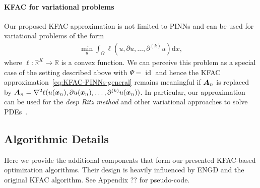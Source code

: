 \paragraph{KFAC for variational problems}
Our proposed KFAC approximation is not limited to PINNs and can be used for variational problems of the form  
\begin{align}
    \min_u \int_\Omega \ell(u, \partial u, \dots, \partial^{(k)} u) \mathrm{d}x,
\end{align}
where $\ell\colon\mathbb R^K\to\mathbb R$ is a convex function. 
We can perceive this problem as a special case of the setting described above with $\Psi = \operatorname{id}$ and hence the KFAC approximation~\eqref{eq:KFAC-PINNs-general} remains meaningful %
if ${\bm{A}}_n$ is replaced by ${\bm{A}}_n = \nabla^2\ell(u({\bm{x}}_n), \partial u({\bm{x}}_n), \dots, \partial^{(k)}u({\bm{x}}_n))$. 
In particular, our approximation can be used for the \emph{deep Ritz method} and other variational approaches to solve PDEs~\citep{yu2018deep}. 

\begin{comment}
    \subsection{Computational complexity}
\todo[inline]{what can we say? probably better to move to the respective approximations}
\begin{itemize}
    \item GN: $O(p^3+Np^2)$
    \item BFGS: $O(p^2+?)$
    \item L-BFGS: $O(mp+?)$?
    \item KFAC: $O(?)$
    \item
\end{itemize}
\end{comment}

\subsection{Algorithmic Details}

Here we provide the additional components that form our presented KFAC-based optimization algorithms.
Their design is heavily influenced by ENGD and the original KFAC algorithm.
See Appendix ?? for pseudo-code.

